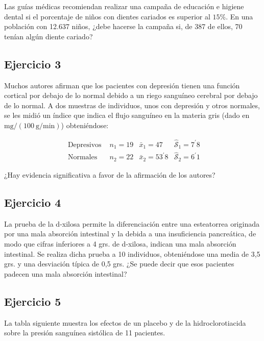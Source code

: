 \documentclass[
]{article}
\begin{document}
Las guías médicas recomiendan realizar una campaña de educación e higiene dental si el porcentaje de niños con dientes cariados es superior al \(15 \%\).
En una población con 12.637 niños, ¿debe hacerse la campaña si, de 387 de ellos, 70 tenían algún diente cariado?

\subsection{Ejercicio 3}\label{ejercicio-3-4}

Muchos autores afirman que los pacientes con depresión tienen una función cortical por debajo de lo normal debido a un riego sanguíneo cerebral por debajo de lo normal. A dos muestras de individuos, unos con depresión y otros normales, se les midió un índice que indica el flujo sanguíneo en la materia gris (dado en \(\mathrm{mg} /(100 \mathrm{~g} / \mathrm{min})\)) obteniéndose:

\[
\begin{array}{l|ccc}
\text { Depresivos } & n_{1}=19 & \bar{x}_{1}=47 & \hat{\mathcal{S}}_{1}=7^{\prime} 8 \\
\hline \text { Normales } & n_{2}=22 & \bar{x}_{2}=53^{\prime} 8 & \hat{\mathcal{S}}_{2}=6^{\prime} 1
\end{array}
\]

¿Hay evidencia significativa a favor de la afirmación de los autores?

\subsection{Ejercicio 4}\label{ejercicio-4-3}

La prueba de la d-xilosa permite la diferenciación entre una esteatorrea originada por una mala absorción intestinal y la debida a una insuficiencia pancreática, de modo que cifras inferiores a 4 grs. de d-xilosa, indican una mala absorción intestinal. Se realiza dicha prueba a 10 individuos, obteniéndose una media de 3,5 grs. y una desviación típica de 0,5 grs. ¿Se puede decir que esos pacientes padecen una mala absorción intestinal?

\subsection{Ejercicio 5}\label{ejercicio-5-4}

La tabla siguiente muestra los efectos de un placebo y de la hidroclorotiacida sobre la presión sanguínea sistólica de 11 pacientes.
\end{document}
